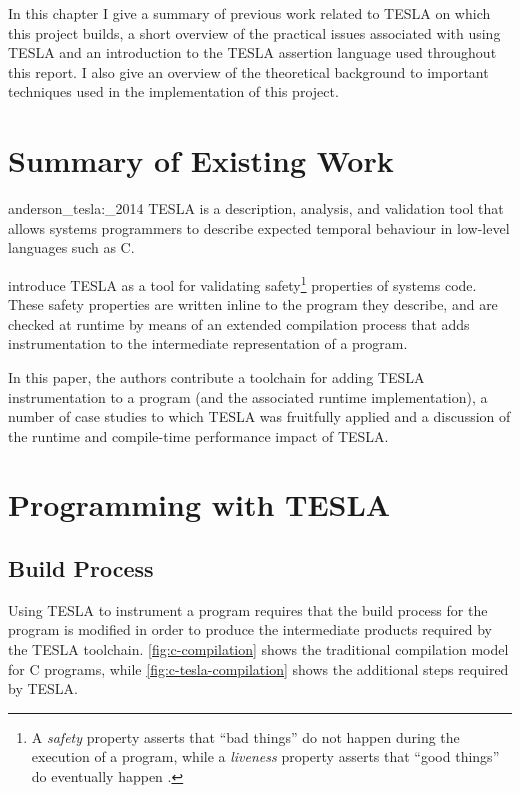 In this chapter I give a summary of previous work related to TESLA on which this
project builds, a short overview of the practical issues associated with using
TESLA and an introduction to the TESLA assertion language used throughout this
report. I also give an overview of the theoretical background to important
techniques used in the implementation of this project.

\section{Summary of Existing Work}

\begin{displaycquote}[p. 1]{anderson_tesla:_2014}
TESLA is a description, analysis, and validation tool that allows systems
  programmers to describe expected temporal behaviour in low-level languages
  such as C.
\end{displaycquote}

\textcite{anderson_tesla:_2014} introduce TESLA as a tool for validating
safety\footnote{A \emph{safety} property asserts that ``bad things'' do not
happen during the execution of a program, while a \emph{liveness} property
asserts that ``good things'' do eventually happen
\cite{lamport_proving_1977,alpern_defining_1984}.} properties of systems code.
These safety properties are written inline to the program they describe, and are
checked at runtime by means of an extended compilation process that adds
instrumentation to the intermediate representation of a program.

In this paper, the authors contribute a toolchain for adding TESLA
instrumentation to a program (and the associated runtime implementation), a
number of case studies to which TESLA was fruitfully applied and a discussion of
the runtime and compile-time performance impact of TESLA.

\section{Programming with TESLA}

\subsection{Build Process} \label{sec:build-tesla}

Using TESLA to instrument a program requires that the build process for the
program is modified in order to produce the intermediate products required by
the TESLA toolchain. \autoref{fig:c-compilation} shows the traditional
compilation model for C programs, while \autoref{fig:c-tesla-compilation} shows
the additional steps required by TESLA.

